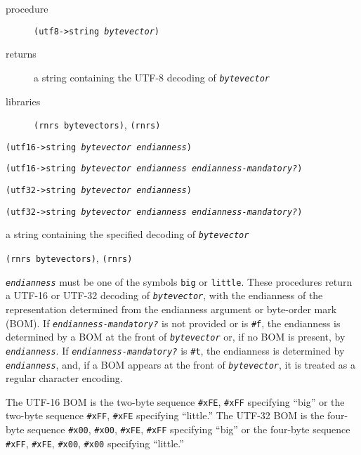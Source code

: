 \begin{description}

\label{io_s95}\item[procedure] \texttt{(utf8-\textgreater{}string \textit{bytevector})}



\item[returns] a string containing the UTF-8 decoding of \texttt{\textit{bytevector}}


\item[libraries] \texttt{(rnrs bytevectors)}, \texttt{(rnrs)}
\end{description}

\begin{description}

\label{io_s96}\item[procedure] \texttt{(utf16-\textgreater{}string \textit{bytevector} \textit{endianness})}



\item[procedure] \texttt{(utf16-\textgreater{}string \textit{bytevector} \textit{endianness} \textit{endianness-mandatory?})}



\item[procedure] \texttt{(utf32-\textgreater{}string \textit{bytevector} \textit{endianness})}



\item[procedure] \texttt{(utf32-\textgreater{}string \textit{bytevector} \textit{endianness} \textit{endianness-mandatory?})}



\item[returns] a string containing the specified decoding of \texttt{\textit{bytevector}}


\item[libraries] \texttt{(rnrs bytevectors)}, \texttt{(rnrs)}
\end{description}

\texttt{\textit{endianness}} must be one of the symbols \texttt{big} or
\texttt{little}.
These procedures return a UTF-16 or UTF-32 decoding of \texttt{\textit{bytevector}},
with the endianness of the representation determined from the endianness
argument or byte-order mark (BOM).
If \texttt{\textit{endianness-mandatory?}} is not provided or is \texttt{\#{}f}, the
endianness is determined by a BOM at the front of \texttt{\textit{bytevector}} or, if
no BOM is present, by \texttt{\textit{endianness}}.
If \texttt{\textit{endianness-mandatory?}} is \texttt{\#{}t}, the endianness is
determined by \texttt{\textit{endianness}}, and, if a BOM appears at the front of
\texttt{\textit{bytevector}}, it is treated as a regular character encoding.

The UTF-16 BOM is the two-byte sequence \texttt{\#{}xFE}, \texttt{\#{}xFF}
specifying ``big'' or the two-byte sequence \texttt{\#{}xFF}, \texttt{\#{}xFE}
specifying ``little.''
The UTF-32 BOM is the four-byte sequence \texttt{\#{}x00}, \texttt{\#{}x00},
\texttt{\#{}xFE}, \texttt{\#{}xFF} specifying ``big'' or the four-byte sequence
\texttt{\#{}xFF}, \texttt{\#{}xFE}, \texttt{\#{}x00}, \texttt{\#{}x00} specifying
``little.''


